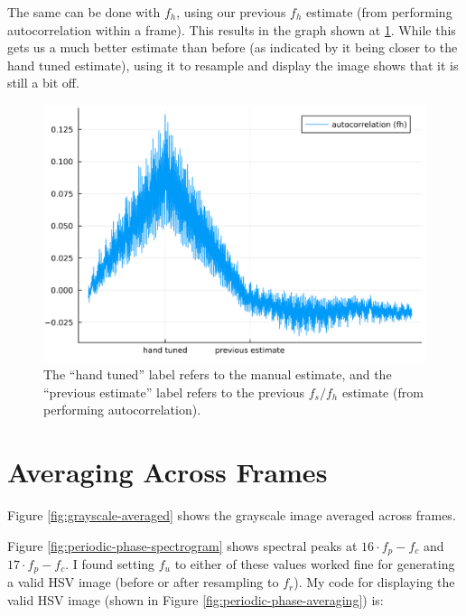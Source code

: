 \documentclass{article}
\begin{document}
The same can be done with $f_h$, using our previous $f_h$ estimate (from performing autocorrelation within a frame). This results in the graph shown at \ref{fig:xcorr-fh}. While this gets us a much better estimate than before (as indicated by it being closer to the hand tuned estimate), using it to resample and display the image shows that it is still a bit off.
\begin{figure}
    \centering
    \includegraphics[width=0.95\linewidth]{images/autocor_fh_step2.png}
    \caption{The ``hand tuned'' label refers to the manual estimate, and the ``previous estimate'' label refers to the previous $f_s/f_h$ estimate (from performing autocorrelation).}
    \label{fig:xcorr-fh}
\end{figure}

\section*{Averaging Across Frames}

Figure \ref{fig:grayscale-averaged} shows the grayscale image averaged across frames.

Figure \ref{fig:periodic-phase-spectrogram} shows spectral peaks at $16 \cdot f_p - f_c$ and $17 \cdot f_p - f_c$. I found setting $f_u$ to either of these values worked fine for generating a valid HSV image (before or after resampling to $f_r$). My code for displaying the valid HSV image (shown in Figure \ref{fig:periodic-phase-averaging}) is:
\end{document}
